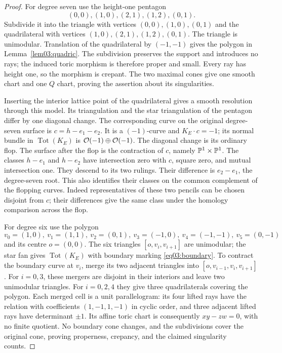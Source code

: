\begin{proof}
For degree seven use the height-one pentagon
\[
 (0,0),(1,0),(2,1),(1,2),(0,1).
\]
Subdivide it into the triangle with vertices $(0,0),(1,0),(0,1)$
and the quadrilateral with vertices $(1,0),(2,1),(1,2),(0,1)$.
The triangle is unimodular.  Translation of the quadrilateral by
$(-1,-1)$ gives the polygon in Lemma~\ref{lem03:quadric}.
The subdivision preserves the support and introduces no rays;
the induced toric morphism is therefore proper and small.
Every ray has height one, so the morphism is crepant.  The two maximal
cones give one smooth chart and one $Q$ chart, proving the assertion
about its singularities.

Inserting the interior lattice point of the quadrilateral gives a
smooth resolution through this model.  Its triangulation and the star
triangulation of the pentagon differ by one diagonal change.  The
corresponding curve on the original degree-seven surface is
$c=h-e_1-e_2$.  It is a $(-1)$-curve and $K_E\cdot c=-1$; its normal
bundle in $\operatorname{Tot}(K_E)$ is
$\mathcal{O}(-1)\oplus\mathcal{O}(-1)$.  The diagonal change is its ordinary flop.
The surface after the flop is the contraction of $c$, namely
$\mathbb{P}^1\times\mathbb{P}^1$.  The classes $h-e_1$ and $h-e_2$ have
intersection zero with $c$, square zero, and mutual intersection one.
They descend to its two rulings.  Their difference is $e_2-e_1$,
the degree-seven root.  This also identifies their classes on the
common complement of the flopping curves.  Indeed representatives of
these two pencils can be chosen disjoint from $c$; their differences
give the same class under the homology comparison across the flop.

For degree six use the polygon
\[
 v_0=(1,0),\ v_1=(1,1),\ v_2=(0,1),\ v_3=(-1,0),
 \ v_4=(-1,-1),\ v_5=(0,-1)
\]
and its centre $o=(0,0)$.  The six triangles
$[o,v_i,v_{i+1}]$ are unimodular; the star fan gives
$\operatorname{Tot}(K_E)$ with boundary marking
\eqref{eq03:boundary}.  To contract the boundary curve at $v_i$,
merge its two adjacent triangles into
$[o,v_{i-1},v_i,v_{i+1}]$.  For $i=0,3$, these mergers are disjoint
in their interiors and leave two unimodular triangles.  For $i=0,2,4$
they give three quadrilaterals covering the polygon.
Each merged cell is a unit parallelogram: its four lifted rays have
the relation with coefficients $(1,-1,1,-1)$ in cyclic order, and
three adjacent lifted rays have determinant $\pm1$.  Its affine
toric chart is consequently $xy-zw=0$, with no finite quotient.
No boundary cone changes, and the subdivisions cover the original
cone, proving properness, crepancy, and the claimed singularity counts.


\end{proof}
